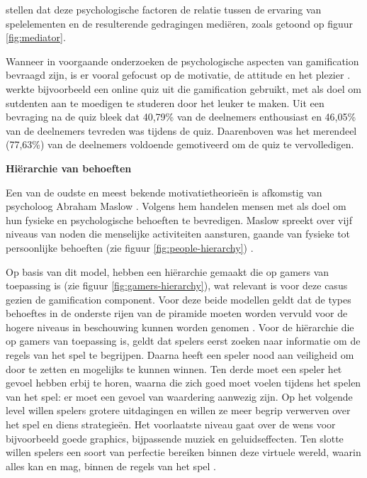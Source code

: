 \textcite{Landers2011} stellen dat deze psychologische factoren de relatie tussen de ervaring van spelelementen en de resulterende gedragingen mediëren, zoals getoond op figuur \ref{fig:mediator}.

Wanneer in voorgaande onderzoeken de psychologische aspecten van gamification bevraagd zijn, is er vooral gefocust op de motivatie, de attitude en het plezier \autocite{Hamari2014}. \textcite{Cheong2013} werkte bijvoorbeeld een online quiz uit die gamification gebruikt, met als doel om sutdenten aan te moedigen te studeren door het leuker te maken. Uit een bevraging  na de quiz bleek dat 40,79\% van de deelnemers enthousiast en 46,05\% van de deelnemers tevreden was tijdens de quiz. Daarenboven was het merendeel (77,63\%) van de deelnemers voldoende gemotiveerd om de quiz te vervolledigen.

\textbf{Hiërarchie van behoeften}

Een van de oudste en meest bekende motivatietheorieën is afkomstig van psycholoog Abraham Maslow \autocite{Richter2014}. Volgens hem handelen mensen met als doel om hun fysieke en psychologische behoeften te bevredigen. Maslow spreekt over vijf niveaus van noden die menselijke activiteiten aansturen, gaande van fysieke tot persoonlijke behoeften (zie figuur \ref{fig:people-hierarchy}) \autocite{Lilienfeld2014}.

Op basis van dit model, hebben \textcite{Siang2003} een hiërarchie gemaakt die op gamers van toepassing is (zie figuur \ref{fig:gamers-hierarchy}), wat relevant is voor deze casus gezien de gamification component.
Voor deze beide modellen geldt dat de types behoeftes in de onderste rijen van de piramide moeten worden vervuld voor de hogere niveaus in beschouwing kunnen worden genomen \autocite{Richter2014}.
Voor de hiërarchie die op gamers van toepassing is, geldt dat spelers eerst zoeken naar informatie om de regels van het spel te begrijpen. Daarna heeft een speler nood aan veiligheid om door te zetten en mogelijks te kunnen winnen. Ten derde moet een speler het gevoel hebben erbij te horen, waarna die zich goed moet voelen tijdens het spelen van het spel: er moet een gevoel van waardering aanwezig zijn. Op het volgende level willen spelers grotere uitdagingen en willen ze meer begrip verwerven over het spel en diens strategieën. Het voorlaatste niveau gaat over de wens voor bijvoorbeeld goede graphics, bijpassende muziek en geluidseffecten. Ten slotte willen spelers een soort van perfectie bereiken binnen deze virtuele wereld, waarin alles kan en mag, binnen de regels van het spel \autocite{Greitzer2007, Siang2003}.

